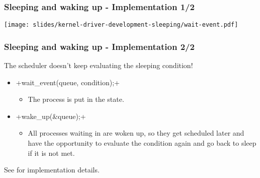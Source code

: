 \begin{frame}[fragile]
  \frametitle{Sleeping and waking up - Implementation 1/2}
  \begin{center}
    \texttt{[image: slides/kernel-driver-development-sleeping/wait-event.pdf]}\\
  \end{center}
\end{frame}

\begin{frame}[fragile]
  \frametitle{Sleeping and waking up - Implementation 2/2}
  The scheduler doesn't keep evaluating the sleeping condition!\\
  \begin{itemize}
  \item {}+wait_event(queue, condition);+
    \begin{itemize}
    \item The process is put in the  state.
    \end{itemize}
  \item {}+wake_up(&queue);+
    \begin{itemize}
    \item All processes waiting in  are woken up, so they get
      scheduled later and have the opportunity to evaluate the
      condition again and go back to sleep if it is not met.
    \end{itemize}
  \end{itemize}
  See  for implementation details.
\end{frame}
